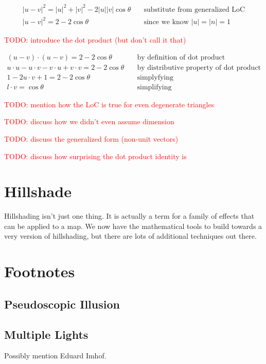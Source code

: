 \documentclass{article}
\newcommand\todo[1]{\textcolor{red}{TODO: #1}}
\begin{document}
\begin{align*}
|u-v|^2 = |u|^2 + |v|^2 - 2 |u| |v| \cos \theta & \quad \text{substitute from generalized LoC} \\
|u-v|^2 = 2 - 2 \cos \theta & \quad \text{since we know } |u| = |n| = 1
\end{align*}

\todo{introduce the dot product (but don't call it that)}

\begin{align*}
(u - v) \cdot (u - v) = 2 - 2 \cos \theta & \quad \text{by definition of dot product} \\
u \cdot u - u \cdot v - v \cdot u + v \cdot v = 2 - 2 \cos \theta & \quad \text{by distributive property of dot product} \\
1 - 2 u \cdot v + 1 = 2 - 2 \cos \theta & \quad \text{simplyfying} \\
l \cdot v = \cos \theta & \quad \text{simplifying}
\end{align*}

\todo{mention how the LoC is true for even degenerate triangles}

\todo{discuss how we didn't even assume dimension}

\todo{discuss the generalized form (non-unit vectors)}

\todo{discuss how surprising the dot product identity is}

\section{Hillshade}

Hillshading isn't just one thing.
It is actually a term for a family of effects that can be applied to a map.
We now have the mathematical tools to build towards a very version of hillshading, but there are lots of additional techniques out there.

\section{Footnotes}

\subsection{Pseudoscopic Illusion}

\subsection{Multiple Lights}

Possibly mention Eduard Imhof.
	
\end{document}
